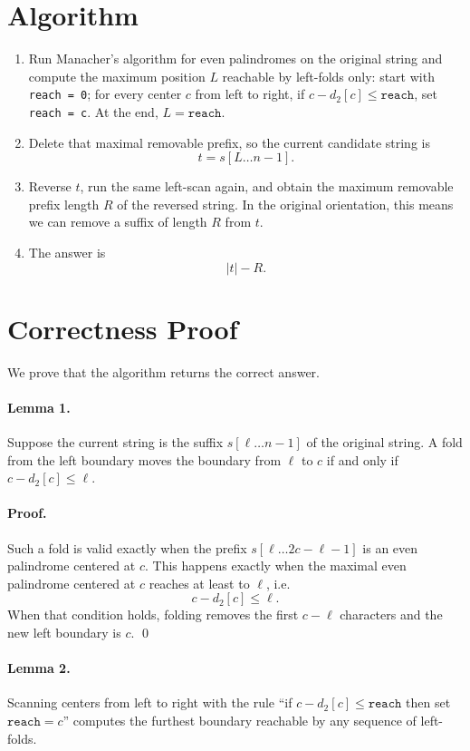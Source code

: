 \documentclass[11pt]{article}
\begin{document}
\section*{Algorithm}

\begin{enumerate}[leftmargin=*]
    \item Run Manacher's algorithm for even palindromes on the original string and compute the maximum position
    $L$ reachable by left-folds only:
    start with \texttt{reach = 0}; for every center $c$ from left to right, if
    $c-d_2[c] \le \texttt{reach}$, set \texttt{reach = c}.
    At the end, $L=\texttt{reach}$.
    \item Delete that maximal removable prefix, so the current candidate string is
    \[
        t = s[L \dots n-1].
    \]
    \item Reverse $t$, run the same left-scan again, and obtain the maximum removable prefix length $R$ of the
    reversed string. In the original orientation, this means we can remove a suffix of length $R$ from $t$.
    \item The answer is
    \[
        |t| - R.
    \]
\end{enumerate}

\section*{Correctness Proof}

We prove that the algorithm returns the correct answer.

\paragraph{Lemma 1.}
Suppose the current string is the suffix $s[\ell \dots n-1]$ of the original string.
A fold from the left boundary moves the boundary from $\ell$ to $c$ if and only if
$c-d_2[c] \le \ell$.

\paragraph{Proof.}
Such a fold is valid exactly when the prefix
$s[\ell \dots 2c-\ell-1]$ is an even palindrome centered at $c$.
This happens exactly when the maximal even palindrome centered at $c$ reaches at least to $\ell$, i.e.
\[
    c-d_2[c] \le \ell.
\]
When that condition holds, folding removes the first $c-\ell$ characters and the new left boundary is $c$.
\qed

\paragraph{Lemma 2.}
Scanning centers from left to right with the rule
``if $c-d_2[c] \le \texttt{reach}$ then set $\texttt{reach}=c$''
computes the furthest boundary reachable by any sequence of left-folds.
\end{document}

